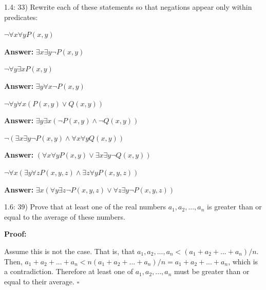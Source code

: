 \documentclass{article}
\newenvironment{proof}
{\color{PineGreen}\begin{list}{}%
         {\setlength{\leftmargin}{1cm}}%
         \item[]%
        \textbf{Proof:}
        
        }
{ $\square$\end{list}}
\newenvironment{answer}
{\color{PineGreen}\begin{list}{}%
         {\setlength{\leftmargin}{1cm}}%
         \item[]%
        \textbf{Answer: }}
{\end{list}}
\begin{document}
1.4: 33) Rewrite each of these statements so that negations appear only within predicates:

\begin{enumerate}[label=\alph{enumi})]
\item $ \neg \forall x \forall y P(x,y) $
\begin{answer}$ \exists x \exists y \neg P(x,y) $\end{answer}
\item $ \neg \forall y \exists x P(x,y) $
\begin{answer}$ \exists y \forall x \neg P(x,y) $\end{answer}
\item $ \neg \forall y \forall x (P(x,y) \vee Q(x,y)) $
\begin{answer}$ \exists y \exists x (\neg P(x,y) \wedge \neg Q(x,y)) $\end{answer}
\item $ \neg ( \exists x \exists y \neg P(x,y) \wedge \forall x \forall y Q(x,y)) $
\begin{answer}$ ( \forall x \forall y P(x,y) \vee \exists x \exists y \neg Q(x,y)) $\end{answer}
\item $ \neg \forall x ( \exists y \forall z P(x,y,z) \wedge \exists z \forall y P(x,y,z)) $
\begin{answer}$  \exists x ( \forall y \exists z \neg P(x,y,z) \vee \forall z \exists y \neg P(x,y,z)) $\end{answer}
\end{enumerate}

1.6: 39) Prove that at least one of the real numbers $a_1,a_2,...,a_n$ is greater than or equal to the average of these numbers.

\begin{proof}
Assume this is not the case. That is, that $a_1,a_2,...,a_n<(a_1+a_2+...+a_n)/n$. Then, $a_1+a_2+...+a_n<n(a_1+a_2+...+a_n)/n=a_1+a_2+...+a_n$, which is a contradiction. Therefore at least one of $a_1,a_2,...,a_n$ must be greater than or equal to their average.
\end{proof}
\end{document}

